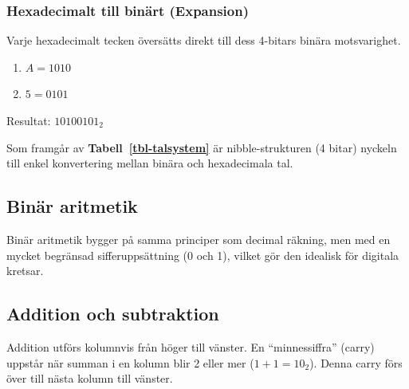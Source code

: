 \documentclass[
  swedish,
  letterpaper,
  oneside,
  openany]{book}
\providecommand{\tightlist}{%
  \setlength{\itemsep}{0pt}\setlength{\parskip}{0pt}}
\begin{document}
\subsubsection{Hexadecimalt till binärt
(Expansion)}\label{hexadecimalt-till-binuxe4rt-expansion}

Varje hexadecimalt tecken översätts direkt till dess 4-bitars binära
motsvarighet.

\begin{tcolorbox}[enhanced jigsaw, arc=.35mm, bottomrule=.15mm, bottomtitle=1mm, breakable, colback=white, colbacktitle=quarto-callout-note-color!10!white, colframe=quarto-callout-note-color-frame, coltitle=black, left=2mm, leftrule=.75mm, opacityback=0, opacitybacktitle=0.6, rightrule=.15mm, title=\textcolor{quarto-callout-note-color}{\faInfo}\hspace{0.5em}{Exempel: Omvandla \(A5_{16}\) till binärt}, titlerule=0mm, toprule=.15mm, toptitle=1mm]

\begin{enumerate}
\def\labelenumi{\arabic{enumi}.}
\tightlist
\item
  \(A = 1010\)
\item
  \(5 = 0101\)
\end{enumerate}

Resultat: \(10100101_2\)

\end{tcolorbox}

Som framgår av \textbf{Tabell~\ref{tbl-talsystem}} är nibble-strukturen
(4 bitar) nyckeln till enkel konvertering mellan binära och hexadecimala
tal.

\subsection{Binär aritmetik}\label{binuxe4r-aritmetik}

Binär aritmetik bygger på samma principer som decimal räkning, men med
en mycket begränsad sifferuppsättning (0 och 1), vilket gör den idealisk
för digitala kretsar.

\subsection{Addition och subtraktion}\label{addition-och-subtraktion}

Addition utförs kolumnvis från höger till vänster. En ``minnessiffra''
(carry) uppstår när summan i en kolumn blir 2 eller mer
(\(1+1 = 10_2\)). Denna carry förs över till nästa kolumn till vänster.
\end{document}
